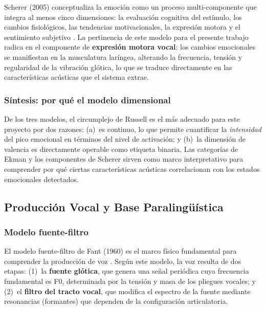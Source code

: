 Scherer (2005) conceptualiza la emoción como un proceso multi-componente que integra
al menos cinco dimensiones: la evaluación cognitiva del estímulo, los cambios
fisiológicos, las tendencias motivacionales, la expresión motora y el sentimiento
subjetivo \cite{scherer2005what}. La pertinencia de este modelo para el presente
trabajo radica en el componente de \textbf{expresión motora vocal}: los cambios
emocionales se manifiestan en la musculatura laríngea, alterando la frecuencia,
tensión y regularidad de la vibración glótica, lo que se traduce directamente en las
características acústicas que el sistema extrae.

\subsubsection{Síntesis: por qué el modelo dimensional}

De los tres modelos, el circumplejo de Russell es el más adecuado para este proyecto
por dos razones: (a)~es continuo, lo que permite cuantificar la \textit{intensidad}
del pico emocional en términos del nivel de activación; y (b)~la dimensión de valencia
es directamente operable como etiqueta binaria. Las categorías de Ekman y los
componentes de Scherer sirven como marco interpretativo para comprender por qué
ciertas características acústicas correlacionan con los estados emocionales detectados.

\subsection{Producción Vocal y Base Paralingüística}
\label{sec:rt_produccion}

\subsubsection{Modelo fuente-filtro}

El modelo fuente-filtro de Fant (1960) es el marco físico fundamental para comprender
la producción de voz \cite{fant1960acoustic}. Según este modelo, la voz resulta de
dos etapas: (1)~la \textbf{fuente glótica}, que genera una señal periódica cuya
frecuencia fundamental es F0, determinada por la tensión y masa de los pliegues vocales;
y (2)~el \textbf{filtro del tracto vocal}, que modifica el espectro de la fuente
mediante resonancias (formantes) que dependen de la configuración articulatoria.

